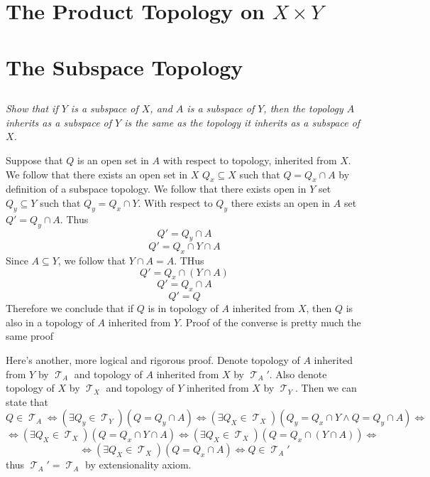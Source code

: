\documentclass[11pt,oneside,titlepage]{book}
\DeclareMathOperator \topol {\mathcal {T}}
\DeclareMathOperator \lra {\Leftrightarrow}
\begin{document}
\section{The Product Topology on $X \times Y$}

\section{The Subspace Topology}

\subsection{}

\textit{Show that if $Y$ is a subspace of $X$, and $A$ is a subspace of $Y$, then the topology
  $A$ inherits as a subspace of $Y$ is the same as the topology it
  inherits as a subspace of $X$.}



Suppose that $Q$ is an open set in $A$ with respect to topology, inherited from $X$.
We follow that there exists an open set in $X$  $Q_x \subseteq X$ such that $Q = Q_x \cap A$
by definition of a subspace topology. We follow that there exists open in $Y$ set $Q_y \subseteq Y$
such that $Q_y = Q_x \cap Y$. With respect to $Q_y$ there exists an open in $A$ set
$Q' = Q_y \cap A$. Thus
$$Q' = Q_y \cap A$$
$$Q' = Q_x \cap Y \cap A$$
Since $A \subseteq Y$, we follow that $Y \cap A = A$. THus
$$Q' = Q_x \cap (Y \cap A)$$
$$Q' = Q_x \cap A$$
$$Q' = Q$$
Therefore we conclude that if $Q$ is in topology of $A$ inherited from $X$, then $Q$ is also
in a topology of $A$ inherited from $Y$. Proof of the converse is pretty much the same
proof

Here's another, more logical and rigorous proof.
Denote topology of $A$ inherited from $Y$ by $\topol_A$ and topology of $A$ inherited from $X$
by $\topol_A'$. Also denote topology of $X$ by $\topol_X$ and topology of $Y$ inherited from $X$
by $\topol_Y$. Then we can state that 
$$Q \in \topol_A \lra (\exists Q_y \in \topol_Y)(Q = Q_y \cap A) \lra
(\exists Q_X \in \topol_X)(Q_y = Q_x \cap Y \land Q = Q_y \cap A) \lra$$
$$ \lra 
(\exists Q_X \in \topol_X)(Q = Q_x \cap Y  \cap A) \lra
(\exists Q_X \in \topol_X)(Q = Q_x \cap (Y  \cap A)) \lra
$$
$$ \lra 
(\exists Q_X \in \topol_X)(Q = Q_x \cap A) \lra
Q \in \topol_A'$$
thus $\topol_A' = \topol_A$ by extensionality axiom.

\subsection{}
\end{document}
